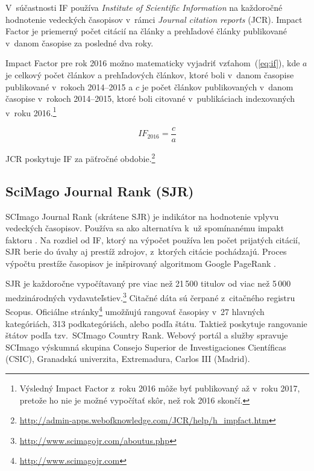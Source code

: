 V~súčastnosti IF používa \emph{Institute of Scientific Information} na
každoročné hodnotenie vedeckých časopisov v~rámci \emph{Journal citation
  reports} (JCR).  Impact Factor je priemerný počet citácií na články a
prehľadové články publikované v~danom časopise za posledné dva roky.

Impact Factor pre rok 2016 možno matematicky vyjadriť vzťahom~(\ref{eq:if}), kde
$a$ je celkový počet článkov a prehľadových článkov, ktoré boli v~danom časopise
publikované v~rokoch 2014--2015 a $c$ je počet článkov publikovaných v~danom
časopise v~rokoch 2014--2015, ktoré boli citované v~publikáciach indexovaných
v~roku 2016.\footnote{Výsledný Impact Factor z~roku 2016 môže byť publikovaný až
  v~roku 2017, pretože ho nie je možné vypočítať skôr, než rok 2016 skončí.}

\begin{equation}
\label{eq:if}
\mathit{IF}_{2016} = \frac{c}{a}
\end{equation}

\noindent JCR poskytuje IF za päťročné obdobie.\footnote{\url{http://admin-apps.webofknowledge.com/JCR/help/h_impfact.htm}}

\subsection{SciMago Journal Rank (SJR)}
\label{sec:sjr}

SCImago Journal Rank (skrátene SJR) je indikátor na hodnotenie vplyvu vedeckých
časopisov.  Používa sa ako alternatíva k~už spomínanému impakt faktoru
\citep{Falagas2008}.  Na rozdiel od IF, ktorý na výpočet používa len počet
prijatých citácií, SJR berie do úvahy aj prestíž zdrojov, z~ktorých citácie
pochádzajú.  Proces výpočtu prestíže časopisov \citep{GuerreroBote2012} je
inšpirovaný algoritmom Google PageRank\texttrademark{} \citep{Page1999}.

SJR je každoročne vypočítavaný pre viac než 21\,500 titulov od viac než 5\,000
medzinárodných
vydavateľstiev.\footnote{\url{http://www.scimagojr.com/aboutus.php}} Citačné
dáta sú čerpané z~citačného registru Scopus\textsuperscript{\textregistered}.
Oficiálne stránky\footnote{\url{http://www.scimagojr.com}} umožňujú rangovať
časopisy v~27 hlavných kategóriách, 313 podkategóriách, alebo podľa štátu.
Taktiež poskytuje rangovanie štátov podľa tzv.~SCImago Country Rank.  Webový
portál a služby spravuje SCImago výskumná skupina Consejo Superior de
Investigaciones Científicas (CSIC), Granadská univerzita, Extremadura, Carlos
III (Madrid).


